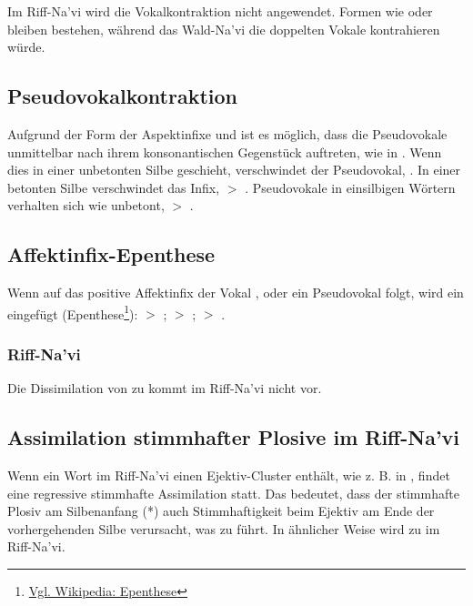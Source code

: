 \subsubsection{} Im Riff-Na'vi wird die Vokalkontraktion nicht angewendet. Formen wie  oder  bleiben bestehen, während das Wald-Na'vi die doppelten Vokale kontrahieren würde.\\
\label{rn:no-contract}

\subsection{Pseudovokalkontraktion} Aufgrund der Form der Aspektinfixe  und  ist es möglich, dass die Pseudovokale unmittelbar nach ihrem konsonantischen Gegenstück auftreten, wie in . Wenn dies in einer unbetonten Silbe geschieht, verschwindet der Pseudovokal, . In einer betonten Silbe verschwindet das Infix,  $>$ . Pseudovokale in einsilbigen Wörtern verhalten sich wie unbetont,  $>$ . 

\subsection{Affektinfix-Epenthese} Wenn auf das positive Affektinfix  der Vokal ,  oder ein Pseudovokal folgt, wird ein  eingefügt (Epenthese\footnote{\href{https://de.wikipedia.org/wiki/Epenthese}{Vgl. Wikipedia: Epenthese}}):  $>$ ;  $>$ ;  $>$ .
\label{lands:eiy-epenth}

\subsubsection{Riff-Na'vi} 
Die Dissimilation von  zu  kommt im Riff-Na'vi nicht vor.


\subsection{Assimilation stimmhafter Plosive im Riff-Na'vi} 
Wenn ein Wort im Riff-Na'vi einen Ejektiv-Cluster enthält, wie z. B. in  , findet eine regressive stimmhafte Assimilation statt.
Das bedeutet, dass der stimmhafte Plosiv am Silbenanfang (*) auch  Stimmhaftigkeit beim  Ejektiv am Ende der vorhergehenden Silbe verursacht, was zu  führt.
In ähnlicher Weise wird   zu  im Riff-Na'vi.

